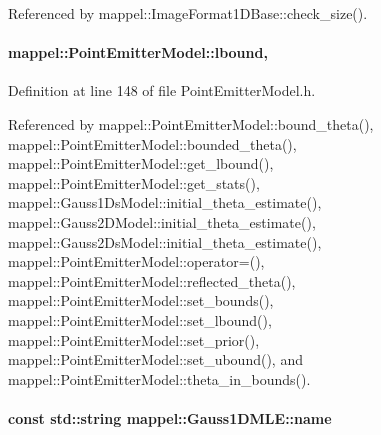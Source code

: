 Referenced by mappel\+::\+Image\+Format1\+D\+Base\+::check\+\_\+size().

\paragraph[{\texorpdfstring{lbound}{lbound}}]{ mappel\+::\+Point\+Emitter\+Model\+::lbound\hspace{0.3cm}{\ttfamily [protected]}, {\ttfamily [inherited]}}\hypertarget{classmappel_1_1PointEmitterModel_a889bc82f74cfa654da121e5770296ab2}{}\label{classmappel_1_1PointEmitterModel_a889bc82f74cfa654da121e5770296ab2}


Definition at line 148 of file Point\+Emitter\+Model.\+h.



Referenced by mappel\+::\+Point\+Emitter\+Model\+::bound\+\_\+theta(), mappel\+::\+Point\+Emitter\+Model\+::bounded\+\_\+theta(), mappel\+::\+Point\+Emitter\+Model\+::get\+\_\+lbound(), mappel\+::\+Point\+Emitter\+Model\+::get\+\_\+stats(), mappel\+::\+Gauss1\+Ds\+Model\+::initial\+\_\+theta\+\_\+estimate(), mappel\+::\+Gauss2\+D\+Model\+::initial\+\_\+theta\+\_\+estimate(), mappel\+::\+Gauss2\+Ds\+Model\+::initial\+\_\+theta\+\_\+estimate(), mappel\+::\+Point\+Emitter\+Model\+::operator=(), mappel\+::\+Point\+Emitter\+Model\+::reflected\+\_\+theta(), mappel\+::\+Point\+Emitter\+Model\+::set\+\_\+bounds(), mappel\+::\+Point\+Emitter\+Model\+::set\+\_\+lbound(), mappel\+::\+Point\+Emitter\+Model\+::set\+\_\+prior(), mappel\+::\+Point\+Emitter\+Model\+::set\+\_\+ubound(), and mappel\+::\+Point\+Emitter\+Model\+::theta\+\_\+in\+\_\+bounds().

\paragraph[{\texorpdfstring{name}{name}}]{\setlength{\rightskip}{0pt plus 5cm}const std\+::string mappel\+::\+Gauss1\+D\+M\+L\+E\+::name\hspace{0.3cm}{\ttfamily [static]}}\hypertarget{classmappel_1_1Gauss1DMLE_a3a9dfff075fc614cceb82b9665b226c5}{}\label{classmappel_1_1Gauss1DMLE_a3a9dfff075fc614cceb82b9665b226c5}


